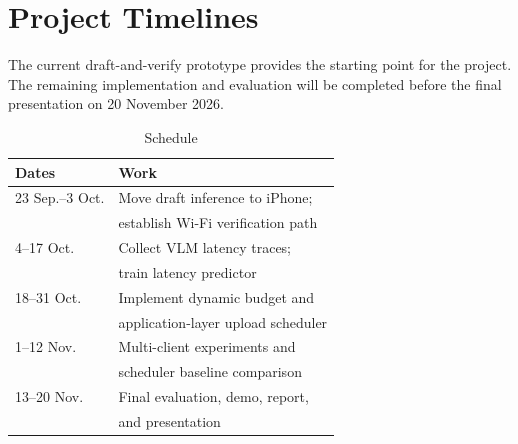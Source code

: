 \section{Project Timelines}

The current draft-and-verify prototype provides the starting point for the
project. The remaining implementation and evaluation will be completed before
the final presentation on 20 November 2026.

\begin{table}[t]
\caption{Schedule}
\label{tab:schedule}
\centering
\begin{tabular}{ll}
\hline
Dates & Work \\
\hline
23 Sep.--3 Oct. &
Move draft inference to iPhone; \\
&
establish Wi-Fi verification path \\

4--17 Oct. &
Collect VLM latency traces; \\
&
train latency predictor \\

18--31 Oct. &
Implement dynamic budget and \\
&
application-layer upload scheduler \\

1--12 Nov. &
Multi-client experiments and \\
&
scheduler baseline comparison \\

13--20 Nov. &
Final evaluation, demo, report, \\
&
and presentation \\
\hline
\end{tabular}
\end{table}
